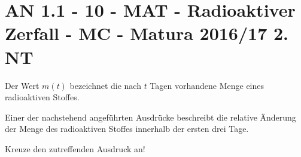\section{AN 1.1 - 10 - MAT - Radioaktiver Zerfall - MC - Matura 2016/17 2. NT}

\begin{beispiel}[AN 1.1]{1} %
Der Wert $m(t)$ bezeichnet die nach $t$ Tagen vorhandene Menge eines radioaktiven Stoffes.

Einer der nachstehend angeführten Ausdrücke beschreibt die relative Änderung der Menge des radioaktiven Stoffes innerhalb der ersten drei Tage.

Kreuze den zutreffenden Ausdruck an!\leer

\end{beispiel}